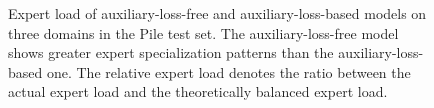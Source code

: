 \documentclass[11pt, a4paper, logo, copyright, nonumbering]{deepseek}
\begin{document}
\begin{CJK*}{UTF8}{gbsn}
\begin{figure}[!t]
    \ContinuedFloat
\end{figure}

\begin{figure}[!t]
    \ContinuedFloat
    \caption{
        Expert load of auxiliary-loss-free and auxiliary-loss-based models on three domains in the Pile test set. 
        The auxiliary-loss-free model shows greater expert specialization patterns than the auxiliary-loss-based one.
        The relative expert load denotes the ratio between the actual expert load and the theoretically balanced expert load. 
    }
\label{fig:detailed_expert_load}
\end{figure}

\newpage

\end{CJK*}
\end{document}
